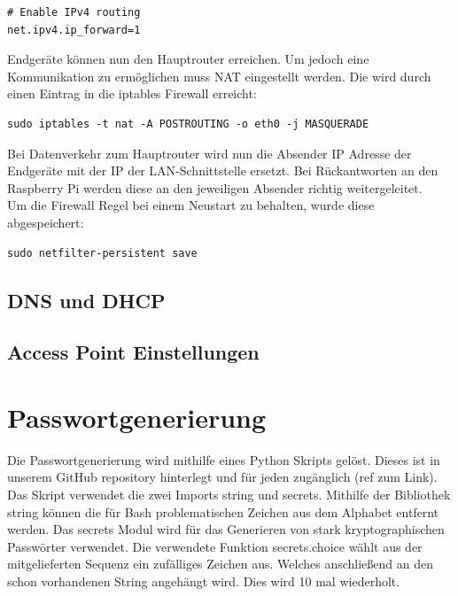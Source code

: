 \documentclass[a4paper,11pt,singlespacing]{article}
\begin{document}
                \begin{lstlisting}
# Enable IPv4 routing
net.ipv4.ip_forward=1
                \end{lstlisting} 
                Endgeräte können nun den Hauptrouter erreichen. Um jedoch eine Kommunikation zu ermöglichen muss NAT eingestellt werden. Die wird durch einen Eintrag in die iptables Firewall erreicht: \\
            
                \begin{lstlisting}
sudo iptables -t nat -A POSTROUTING -o eth0 -j MASQUERADE
                \end{lstlisting} 
       
                Bei Datenverkehr zum Hauptrouter wird nun die Absender IP Adresse der Endgeräte mit der IP der LAN-Schnittstelle ersetzt. Bei Rückantworten an den Raspberry Pi werden diese an den jeweiligen Absender richtig weitergeleitet.\\
            
                Um die Firewall Regel bei einem Neustart zu behalten, wurde diese abgespeichert:\\
                
            \begin{lstlisting}
sudo netfilter-persistent save
         \end{lstlisting}    
            \subsection{DNS und DHCP}
            \subsection{Access Point Einstellungen}
         
            
    	\section{Passwortgenerierung}
    		Die Passwortgenerierung wird mithilfe eines Python Skripts gelöst. Dieses ist in unserem GitHub repository hinterlegt und für jeden zugänglich (ref zum Link). Das Skript verwendet die zwei Imports string und secrets. Mithilfe der Bibliothek string können die für Bash problematischen Zeichen aus dem Alphabet entfernt werden. Das secrets Modul wird für das Generieren von stark kryptographischen Passwörter verwendet. Die verwendete Funktion secrets.choice wählt aus der mitgelieferten Sequenz ein zufälliges Zeichen aus. Welches anschließend an den schon vorhandenen String angehängt wird. Dies wird 10 mal wiederholt.
    	
\end{document}
